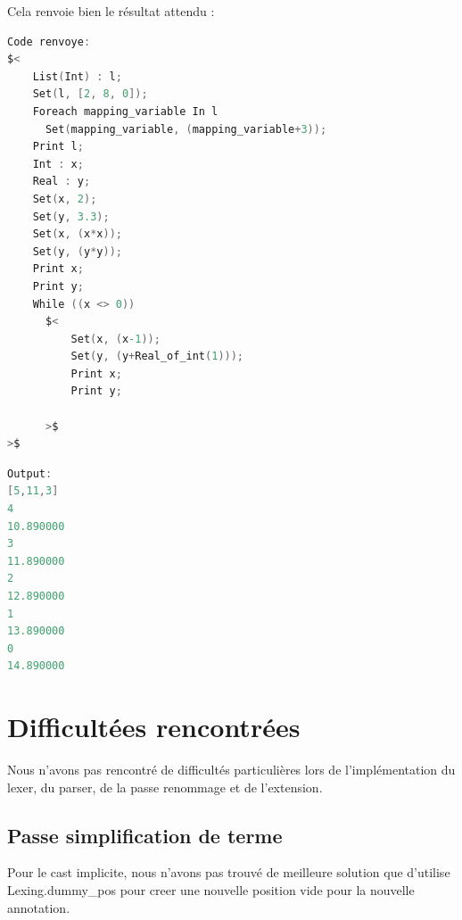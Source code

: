 \documentclass{report}
\begin{document}
    Cela renvoie bien le résultat attendu : \\

    \begin{lstlisting}[language=C, basicstyle=\ttfamily]
Code renvoye:
$<
    List(Int) : l;
    Set(l, [2, 8, 0]);
    Foreach mapping_variable In l
      Set(mapping_variable, (mapping_variable+3));
    Print l;
    Int : x;
    Real : y;
    Set(x, 2);
    Set(y, 3.3);
    Set(x, (x*x));
    Set(y, (y*y));
    Print x;
    Print y;
    While ((x <> 0))
      $<
          Set(x, (x-1));
          Set(y, (y+Real_of_int(1)));
          Print x;
          Print y;
          
      >$
>$
    \end{lstlisting}

    \begin{lstlisting}[language=C, basicstyle=\ttfamily]
Output:
[5,11,3]
4
10.890000
3
11.890000
2
12.890000
1
13.890000
0
14.890000      
    \end{lstlisting}

    \newpage

\chapter{Difficultées rencontrées}

   \quad Nous n'avons pas rencontré de difficultés particulières lors de l'implémentation du lexer, du parser, de la passe renommage et de l'extension.\\

    \section{Passe simplification de terme}

    Pour le cast implicite, nous n'avons pas trouvé de meilleure solution que d'utilise Lexing.dummy\_pos pour creer une nouvelle position vide pour la nouvelle annotation.\\
\end{document}
